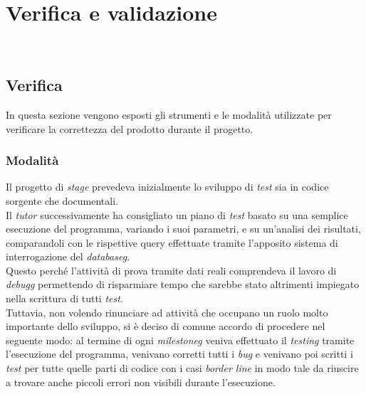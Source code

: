 
\chapter{Verifica e validazione}
\label{cap:verifica-validazione}

\noindent {}\\

\section{Verifica}
\noindent In questa sezione vengono esposti gli strumenti e le modalità utilizzate
per verificare la correttezza del prodotto durante il progetto.

\subsection{Modalità}
\noindent Il progetto di \textit{stage} prevedeva inizialmente lo sviluppo di \textit{test} sia in codice
sorgente che documentali.\\

\noindent Il \textit{tutor} successivamente ha consigliato un piano di \textit{test} basato su una semplice
esecuzione del programma, variando i suoi parametri, e su un'analisi
dei risultati, comparandoli con le rispettive query effettuate tramite
l'apposito sistema di interrogazione del \textit{\gls{databaseg}}.\\
Questo perché l’attività di prova tramite dati reali comprendeva il lavoro
di \textit{\gls{debugg}} permettendo di risparmiare tempo che sarebbe stato altrimenti
impiegato nella scrittura di tutti \textit{test}.\\

\noindent Tuttavia, non volendo rinunciare ad attività che occupano un ruolo molto importante dello
sviluppo, si è deciso di comune accordo di procedere nel seguente modo:
al termine di ogni \textit{\gls{milestoneg}} veniva effettuato il \textit{testing} tramite l'esecuzione del
programma, venivano corretti tutti i \textit{bug} e venivano poi scritti i \textit{test} per tutte
quelle parti di codice con i casi \textit{border line} in modo tale da riuscire a trovare anche
piccoli errori non visibili durante l'esecuzione.\\

